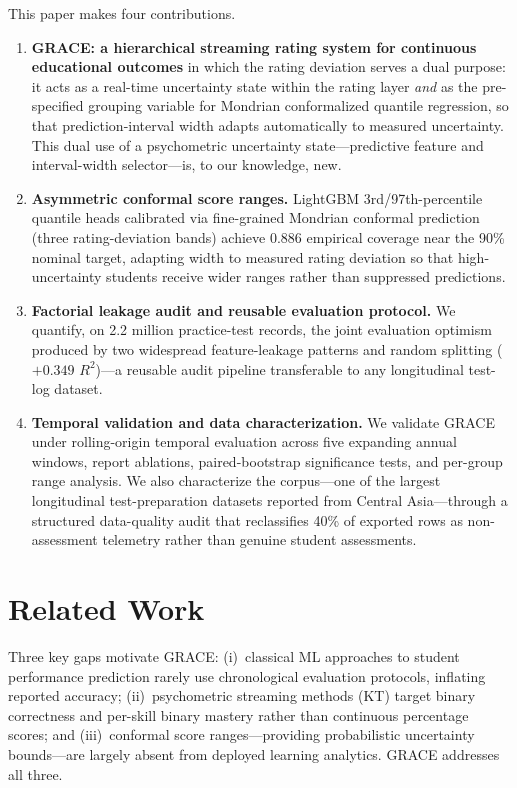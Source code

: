 \documentclass[11pt]{article}
\begin{document}
This paper makes four contributions.
\begin{enumerate}
\item \textbf{GRACE: a hierarchical streaming rating system for continuous educational
outcomes} in which the rating deviation serves a dual purpose: it acts as a real-time
uncertainty state within the rating layer \emph{and} as the pre-specified grouping
variable for Mondrian conformalized quantile regression, so that prediction-interval
width adapts automatically to measured uncertainty.
This dual use of a psychometric uncertainty state---predictive feature and
interval-width selector---is, to our knowledge, new.

\item \textbf{Asymmetric conformal score ranges.}
LightGBM 3rd/97th-percentile quantile heads calibrated via fine-grained Mondrian
conformal prediction (three rating-deviation bands) achieve 0.886 empirical coverage
near the 90\% nominal target, adapting width to measured rating deviation so that
high-uncertainty students receive wider ranges rather than suppressed predictions.

\item \textbf{Factorial leakage audit and reusable evaluation protocol.}
We quantify, on 2.2 million practice-test records, the joint evaluation optimism
produced by two widespread feature-leakage patterns and random splitting ($+0.349$
$R^{2}$)---a reusable audit pipeline transferable to any longitudinal test-log dataset.

\item \textbf{Temporal validation and data characterization.}
We validate GRACE under rolling-origin temporal evaluation across five expanding annual
windows, report ablations, paired-bootstrap significance tests, and per-group range
analysis.  We also characterize the corpus---one of the largest longitudinal test-preparation
datasets reported from Central Asia---through a structured data-quality audit that
reclassifies 40\% of exported rows as non-assessment telemetry rather than genuine
student assessments.
\end{enumerate}

\section{Related Work}

Three key gaps motivate GRACE: (i)~classical ML approaches to student
performance prediction rarely use chronological evaluation protocols, inflating reported
accuracy; (ii)~psychometric streaming methods (KT) target binary correctness and
per-skill binary mastery rather than continuous percentage scores; and (iii)~conformal
score ranges---providing probabilistic uncertainty bounds---are largely absent from
deployed learning analytics.
GRACE addresses all three.
\end{document}
